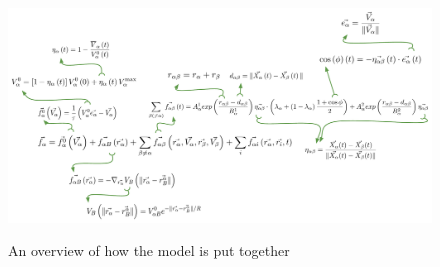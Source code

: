 \begin{figure}[hb] %
    \centering
    {\includegraphics[scale=0.45]{Figures/overview.pdf}} 
    \caption{An overview of how the model is put together}
    \label{overview}
\end{figure}

\clearpage





